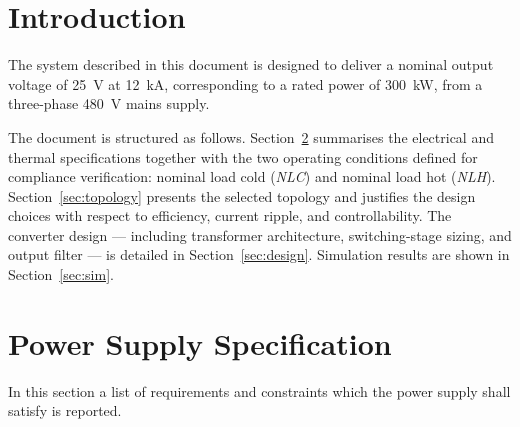\documentclass[11pt,a4paper]{scrartcl}
\begin{document}
\begin{onehalfspace}
\section{Introduction}

The system described in this document is designed to deliver a nominal output voltage of \SI{25}{\volt} at \SI{12}{\kilo\ampere},
corresponding to a rated power of \SI{300}{\kilo\watt}, from a three-phase \SI{480}{\volt} mains supply.

The document is structured as follows. Section~\ref{sec:specs} summarises the electrical
and thermal specifications together with the two operating conditions defined for
compliance verification: nominal load cold (\emph{NLC}) and nominal load hot (\emph{NLH}).
Section~\ref{sec:topology} presents the selected topology and justifies the design choices
with respect to efficiency, current ripple, and controllability.
The converter design — including transformer architecture, switching-stage sizing, and
output filter — is detailed in Section~\ref{sec:design}. Simulation results are shown in Section~\ref{sec:sim}.

\section{Power Supply Specification}\label{sec:specs}
In this section a list of requirements and constraints which the power supply shall satisfy is reported. 


\end{onehalfspace}
\end{document}
